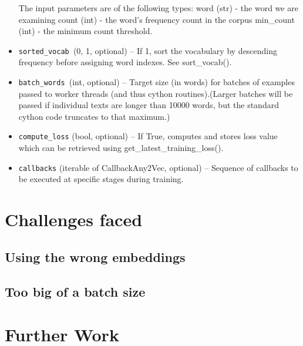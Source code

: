 \begin{itemize}
    The input parameters are of the following types:
            word (str) - the word we are examining
            count (int) - the word’s frequency count in the corpus
            min\_count (int) - the minimum count threshold.

  \item  \texttt{sorted\_vocab }({0, 1}, optional) – If 1, sort the vocabulary by descending frequency before assigning word indexes. See sort\_vocab().
 \item   \texttt{batch\_words }(int, optional) – Target size (in words) for batches of examples passed to worker threads (and thus cython routines).(Larger batches will be passed if individual texts are longer than 10000 words, but the standard cython code truncates to that maximum.)
  \item  \texttt{compute\_loss} (bool, optional) – If True, computes and stores loss value which can be retrieved using get\_latest\_training\_loss().
 \item   \texttt{callbacks} (iterable of CallbackAny2Vec, optional) – Sequence of callbacks to be executed at specific stages during training.

\end{itemize}

\section{Challenges faced}
\subsection{Using the wrong embeddings}
\subsection{Too big of a batch size}
\section{Further Work}